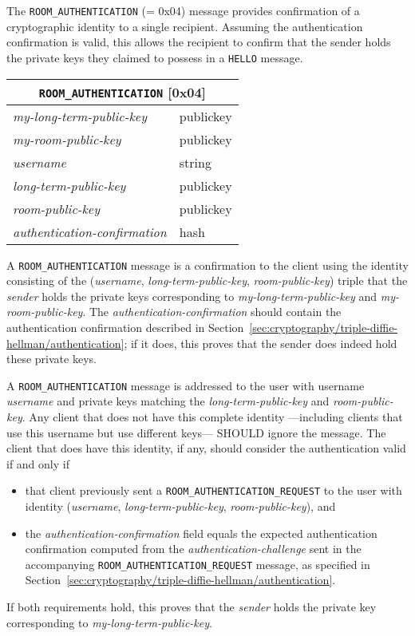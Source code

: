 \documentclass{article}
\def\npmessage#1{\texttt{#1}}
\def\field#1{\textit{#1}}
\def\type#1{\textsf{#1}}
\newenvironment{basicmessage}[2]{
\newcommand{\messagefield}[2]{
\field{##1} & \type{##2} \\
\hline
}
\hspace{2em minus 2em}\begin{tabular}{|l|l|}
\hline
\multicolumn{2}{|c|}{\npmessage{#1} [#2]} \\
\hline
\hline
}{
\end{tabular}
}
\begin{document}
The \npmessage{ROOM\_AUTHENTICATION} (= 0x04) message provides confirmation of a cryptographic identity to a single recipient.
Assuming the authentication confirmation is valid, this allows the recipient to confirm that the sender holds the private keys they claimed to possess in a \npmessage{HELLO} message.

\begin{basicmessage}{ROOM\_AUTHENTICATION}{0x04}
\messagefield{my-long-term-public-key}{publickey}
\messagefield{my-room-public-key}{publickey}
\messagefield{username}{string}
\messagefield{long-term-public-key}{publickey}
\messagefield{room-public-key}{publickey}
\messagefield{authentication-confirmation}{hash}
\end{basicmessage}

A \npmessage{ROOM\_AUTHENTICATION} message is a confirmation to the client using the identity consisting of the (\field{username}, \field{long-term-public-key}, \field{room-public-key}) triple that the \field{sender} holds the private keys corresponding to \field{my-long-term-public-key} and \field{my-room-public-key}.
The \emph{authentication-confirmation} should contain the authentication confirmation described in Section~\ref{sec:cryptography/triple-diffie-hellman/authentication}; if it does, this proves that the sender does indeed hold these private keys.

A \npmessage{ROOM\_AUTHENTICATION} message is addressed to the user with username \field{username} and private keys matching the \field{long-term-public-key} and \field{room-public-key}.
Any client that does not have this complete identity ---including clients that use this username but use different keys--- SHOULD ignore the message.
The client that does have this identity, if any, should consider the authentication valid if and only if
\begin{itemize}
\item that client previously sent a \npmessage{ROOM\_AUTHENTICATION\_REQUEST} to the user with identity (\field{username}, \field{long-term-public-key}, \field{room-public-key}), and
\item the \field{authentication-confirmation} field equals the expected authentication confirmation computed from the \field{authentication-challenge} sent in the accompanying \npmessage{ROOM\_AUTHENTICATION\_REQUEST} message, as specified in Section~\ref{sec:cryptography/triple-diffie-hellman/authentication}.
\end{itemize}
If both requirements hold, this proves that the \field{sender} holds the private key corresponding to \field{my-long-term-public-key}.
\end{document}
